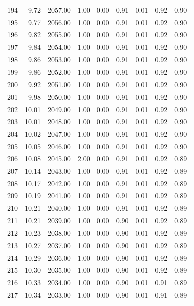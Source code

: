 \documentclass{article}\usepackage[]{graphicx}\usepackage[]{color}
\begin{document}
\begin{longtable}{rrrrrrrrr}
  194 & 9.72 & 2057.00 & 1.00 & 0.00 & 0.91 & 0.01 & 0.92 & 0.90 \\ 
  195 & 9.77 & 2056.00 & 1.00 & 0.00 & 0.91 & 0.01 & 0.92 & 0.90 \\ 
  196 & 9.82 & 2055.00 & 1.00 & 0.00 & 0.91 & 0.01 & 0.92 & 0.90 \\ 
  197 & 9.84 & 2054.00 & 1.00 & 0.00 & 0.91 & 0.01 & 0.92 & 0.90 \\ 
  198 & 9.86 & 2053.00 & 1.00 & 0.00 & 0.91 & 0.01 & 0.92 & 0.90 \\ 
  199 & 9.86 & 2052.00 & 1.00 & 0.00 & 0.91 & 0.01 & 0.92 & 0.90 \\ 
  200 & 9.92 & 2051.00 & 1.00 & 0.00 & 0.91 & 0.01 & 0.92 & 0.90 \\ 
  201 & 9.98 & 2050.00 & 1.00 & 0.00 & 0.91 & 0.01 & 0.92 & 0.90 \\ 
  202 & 10.01 & 2049.00 & 1.00 & 0.00 & 0.91 & 0.01 & 0.92 & 0.90 \\ 
  203 & 10.01 & 2048.00 & 1.00 & 0.00 & 0.91 & 0.01 & 0.92 & 0.90 \\ 
  204 & 10.02 & 2047.00 & 1.00 & 0.00 & 0.91 & 0.01 & 0.92 & 0.90 \\ 
  205 & 10.05 & 2046.00 & 1.00 & 0.00 & 0.91 & 0.01 & 0.92 & 0.90 \\ 
  206 & 10.08 & 2045.00 & 2.00 & 0.00 & 0.91 & 0.01 & 0.92 & 0.89 \\ 
  207 & 10.14 & 2043.00 & 1.00 & 0.00 & 0.91 & 0.01 & 0.92 & 0.89 \\ 
  208 & 10.17 & 2042.00 & 1.00 & 0.00 & 0.91 & 0.01 & 0.92 & 0.89 \\ 
  209 & 10.19 & 2041.00 & 1.00 & 0.00 & 0.91 & 0.01 & 0.92 & 0.89 \\ 
  210 & 10.21 & 2040.00 & 1.00 & 0.00 & 0.91 & 0.01 & 0.92 & 0.89 \\ 
  211 & 10.21 & 2039.00 & 1.00 & 0.00 & 0.90 & 0.01 & 0.92 & 0.89 \\ 
  212 & 10.23 & 2038.00 & 1.00 & 0.00 & 0.90 & 0.01 & 0.92 & 0.89 \\ 
  213 & 10.27 & 2037.00 & 1.00 & 0.00 & 0.90 & 0.01 & 0.92 & 0.89 \\ 
  214 & 10.29 & 2036.00 & 1.00 & 0.00 & 0.90 & 0.01 & 0.92 & 0.89 \\ 
  215 & 10.30 & 2035.00 & 1.00 & 0.00 & 0.90 & 0.01 & 0.92 & 0.89 \\ 
  216 & 10.33 & 2034.00 & 1.00 & 0.00 & 0.90 & 0.01 & 0.91 & 0.89 \\ 
  217 & 10.34 & 2033.00 & 1.00 & 0.00 & 0.90 & 0.01 & 0.91 & 0.89 \\ 

\end{longtable}
\end{document}
